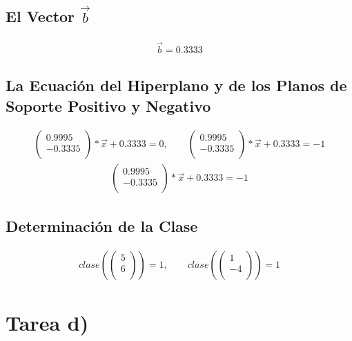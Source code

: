 \documentclass[fleqn]{llncs}
\begin{document}
\subsection{El Vector $\overrightarrow{b}$}
\begin{align*}
	\overrightarrow{b} = 0.3333
\end{align*}

\subsection{La Ecuación del Hiperplano y de los Planos de Soporte Positivo y Negativo}
\begin{align*}
	\begin{pmatrix}
		0.9995 \\
		-0.3335 \\
	\end{pmatrix} * \overrightarrow{x} + 0.3333 = 0,
	\qquad
	\begin{pmatrix}
		0.9995 \\
		-0.3335 \\
	\end{pmatrix} * \overrightarrow{x} + 0.3333 = -1
\end{align*}
\begin{align*}
	\begin{pmatrix}
		0.9995 \\
		-0.3335 \\
	\end{pmatrix} * \overrightarrow{x} + 0.3333 = -1
\end{align*}

\subsection{Determinación de la Clase}
\begin{align*}
	clase \left(
	\begin{pmatrix}
		5 \\
		6 \\
	\end{pmatrix} \right) = 1,
	\qquad
	clase \left(
	\begin{pmatrix}
		1 \\
		-4 \\
	\end{pmatrix} \right) = 1
\end{align*}


\section{Tarea d)}
\end{document}
